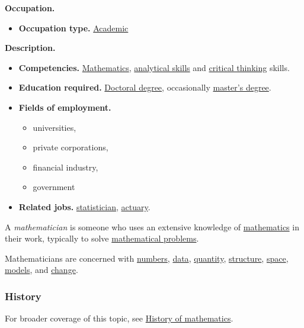 \documentclass{article}
\begin{document}
\noindent
\textbf{Occupation.}
\begin{itemize}
	\item \textbf{Occupation type.} \href{https://en.wikipedia.org/wiki/Academic}{Academic}
\end{itemize}
\textbf{Description.}
\begin{itemize}
	\item \textbf{Competencies.} \href{https://en.wikipedia.org/wiki/Mathematics}{Mathematics}, \href{https://en.wikipedia.org/wiki/Analytical_skill}{analytical skills} and \href{https://en.wikipedia.org/wiki/Critical_thinking}{critical thinking} skills.
	\item \textbf{Education required.} \href{https://en.wikipedia.org/wiki/Doctoral_degree}{Doctoral degree}, occasionally \href{https://en.wikipedia.org/wiki/Master's_degree}{master's degree}.
	\item \textbf{Fields of employment.}
	\begin{itemize}
		\item universities,
		\item private corporations,
		\item financial industry,
		\item government
	\end{itemize}
	\item \textbf{Related jobs.} \href{https://en.wikipedia.org/wiki/Statistician}{statistician}, \href{https://en.wikipedia.org/wiki/Actuary}{actuary}.
\end{itemize}
A \textit{mathematician} is someone who uses an extensive knowledge of \href{https://en.wikipedia.org/wiki/Mathematics}{mathematics} in their work, typically to solve \href{https://en.wikipedia.org/wiki/Mathematical_problem}{mathematical problems}.

Mathematicians are concerned with \href{https://en.wikipedia.org/wiki/Number}{numbers}, \href{https://en.wikipedia.org/wiki/Data}{data}, \href{https://en.wikipedia.org/wiki/Quantity}{quantity}, \href{https://en.wikipedia.org/wiki/Mathematical_structure}{structure}, \href{https://en.wikipedia.org/wiki/Space}{space}, \href{https://en.wikipedia.org/wiki/Mathematical_model}{models}, and \href{https://en.wikipedia.org/wiki/Mathematics#Change}{change}.

\subsubsection{History}
For broader coverage of this topic, see \href{https://en.wikipedia.org/wiki/History_of_mathematics}{History of mathematics}.
\end{document}
